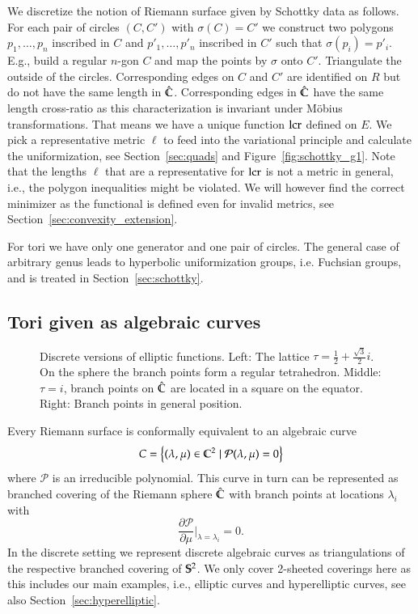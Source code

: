 \documentclass[Thesis]{subfiles}
\begin{document}
We discretize the notion of Riemann surface given by Schottky data as follows.
For each pair of circles $(C, C')$ with $\sigma(C) =C'$ we construct two polygons $p_1,\ldots,p_n$ inscribed in $C$ and $p'_1,\ldots,p'_n$ inscribed in $C'$ such that $\sigma(p_i)=p'_i$. E.g., build a regular $n$-gon $C$ and map the points by $\sigma$ onto $C'$.
Triangulate the outside of the circles.
Corresponding edges on $C$ and $C'$ are identified on $R$ but do not have the same length in $\Chat$.
Corresponding edges in $\Chat$ have the same length cross-ratio as this characterization is invariant under M\"{o}bius transformations.
That means we have a unique function $\lcr$ defined on $E$.
We pick a representative metric $\ell$ to feed into the variational principle and calculate the uniformization, see Section~\ref{sec:quads} and Figure~\ref{fig:schottky_g1}.
Note that the lengths $\ell$ that are a representative for $\lcr$ is not a metric in general, i.e., the polygon inequalities might be violated.
We will however find the correct minimizer as the functional is defined even for invalid metrics, see Section~\ref{sec:convexity_extension}.

For tori we have only one generator and one pair of circles. 
The general case of arbitrary genus leads to hyperbolic uniformization groups, i.e. Fuchsian groups, and is treated in Section~\ref{sec:schottky}.

\subsection{Tori given as algebraic curves}
\label{sec:discrete_algebraic_curves}

\begin{figure}
\centering
{}
\caption{Discrete versions of elliptic functions. Left: The lattice $\tau=\frac{1}{2}+\frac{\sqrt 3}{2}i$. On the sphere the branch points form a regular tetrahedron. Middle: $\tau=i$, branch points on $\hat \C$ are located in a square on the equator. Right: Branch points in general position.}
\label{fig:p_functions}
\end{figure}

Every Riemann surface is conformally equivalent to an algebraic curve
\[C=\left\{(\lambda,\mu)\in \C^2 \mid \mathcal P(\lambda,\mu)=0\right\}\]
where $\mathcal P$ is an irreducible polynomial.
This curve in turn can be represented as branched covering of the Riemann sphere $\hat{\C}$ with branch points at locations $\lambda_i$ with \[\frac{\partial\mathcal P}{\partial \mu}\Bigr|_{\lambda=\lambda_i} = 0.\]
In the discrete setting we represent discrete algebraic curves as triangulations of the respective branched covering of $\S^2$.
We only cover 2-sheeted coverings here as this includes our main examples, i.e., elliptic curves and hyperelliptic curves, see also Section~\ref{sec:hyperelliptic}.
\end{document}
